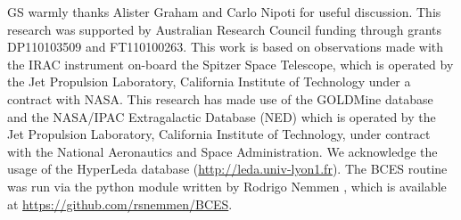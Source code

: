\documentclass[preprint2]{emulateapj}
\begin{document}





\acknowledgments
GS warmly thanks Alister Graham and Carlo Nipoti for useful discussion. 
This research was supported by Australian Research Council funding through grants
DP110103509 and FT110100263.
This work is based on observations made with the IRAC instrument \citep{fazio2004IRAC} 
on-board the Spitzer Space Telescope, 
which is operated by the Jet Propulsion Laboratory, 
California Institute of Technology under a contract with NASA.
This research has made use of the GOLDMine database \citep{goldmine} and the NASA/IPAC Extragalactic Database (NED) 
which is operated by the Jet Propulsion Laboratory, California Institute of Technology, 
under contract with the National Aeronautics and Space Administration. 
We acknowledge the usage of the HyperLeda database (\url{http://leda.univ-lyon1.fr}).
The BCES routine \citep{akritasbershady1996} was run via the python module 
written by Rodrigo Nemmen \citep{nemmen2012}, which is available at \url{https://github.com/rsnemmen/BCES}.






\clearpage
\end{document}
